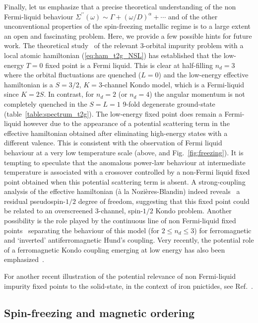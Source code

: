 \documentclass[]{ar2e-changed}%
\begin{document}
Finally, let us emphasize that a precise theoretical understanding of the non Fermi-liquid behaviour 
$\Sigma^{\prime\prime}(\omega) \sim \Gamma + (\omega/D)^\alpha+\cdots$ and of the 
other unconventional properties of the spin-freezing metallic regime is to a large extent an 
open and fascinating problem. 
%
Here, we provide a few possible hints for future work. 
%
The theoretical study~\cite{leo04thesis} of the relevant 3-orbital impurity problem with a local atomic hamiltonian 
(\ref{eq:ham_t2g_NSL}) has established that the low-energy $T=0$ fixed point is a Fermi liquid. 
%
This is clear at half-filling $n_d=3$ where the orbital fluctuations are quenched ($L=0$) and 
the low-energy effective hamiltonian is a $S=3/2$, $K=3$-channel Kondo model, which is a 
Fermi-liquid since $K=2S$. 
%
In contrast, for $n_d=2$ (or $n_d=4$) the angular momentum is not completely quenched in the 
$S=L=1$ 9-fold degenerate ground-state (table~\ref{table:spectrum_t2g}). 
%
The low-energy fixed point does remain a Fermi-liquid however 
due to the appearance of a potential scattering term in the effective hamiltonian obtained 
after eliminating high-energy states with a different valence. 
% 
This is consistent with the observation of Fermi liquid behaviour at a very low temperature scale 
(above, and Fig.~\ref{fig:freezing}). 
%
It is tempting to speculate that the anomalous power-law behaviour at intermediate temperature is 
associated with a crossover controlled by a non-Fermi liquid fixed point obtained when this 
potential scattering term is absent. 
% 
A strong-coupling analysis of the effective hamiltonian (\`a la Nozi\`eres-Blandin) indeed 
reveals~\cite{leo04thesis} a residual pseudospin-$1/2$ degree of freedom, suggesting that this fixed 
point could be related to an overscreened 3-channel, spin-$1/2$ Kondo problem. 
%
Another possibility is the role played by the continuous line of non Fermi-liquid fixed points~\cite{leo04thesis} 
separating the behaviour of this model (for $2\leq n_d\leq 3$) for ferromagnetic and 
`inverted' antiferromagnetic Hund's coupling. Very recently, the potential role of a ferromagnetic Kondo 
coupling emerging at low energy has also been emphasized~\cite{yin_powerlaws_arxiv_2012}. 

For another recent illustration of the potential relevance of non Fermi-liquid impurity fixed points 
to the solid-state, in the context of iron pnictides, see Ref.~\cite{ong_coleman_tetrahedron_prl_2012}.  


\subsection{Spin-freezing and magnetic ordering}
\label{sec:freezing_ordering}
\end{document}
